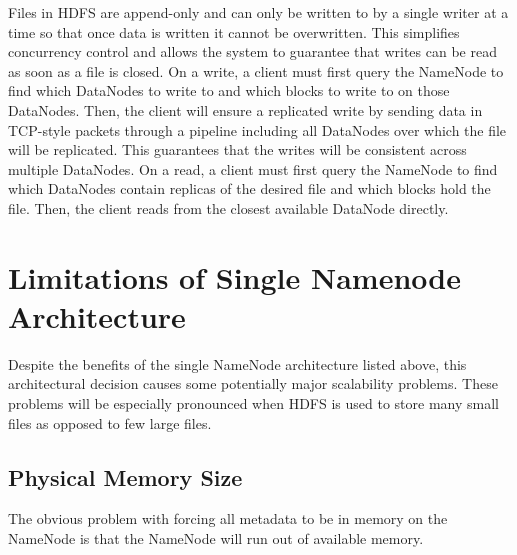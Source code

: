 \documentclass[11pt, a4paper]{article}
\begin{document}
\begin{multicols*}{2}
Files in HDFS are append-only and can only be written to by a single writer at a time so that once data is written it cannot be overwritten. This simplifies concurrency control and allows the system to guarantee that writes can be read as soon as a file is closed. On a write, a client must first query the NameNode to find which DataNodes to write to and which blocks to write to on those DataNodes. Then, the client will ensure a replicated write by sending data in TCP-style packets through a pipeline including all DataNodes over which the file will be replicated. This guarantees that the writes will be consistent across multiple DataNodes. On a read, a client must first query the NameNode to find which DataNodes contain replicas of the desired file and which blocks hold the file. Then, the client reads from the closest available DataNode directly. 


\section{Limitations of Single Namenode Architecture}

Despite the benefits of the single NameNode architecture listed above, this architectural decision causes some potentially major scalability problems. These problems will be especially pronounced when HDFS is used to store many small files as opposed to few large files. 

\subsection{Physical Memory Size}




The obvious problem with forcing all metadata to be in memory on the NameNode is that the NameNode will run out of available memory. %


\end{multicols*}
\end{document}
